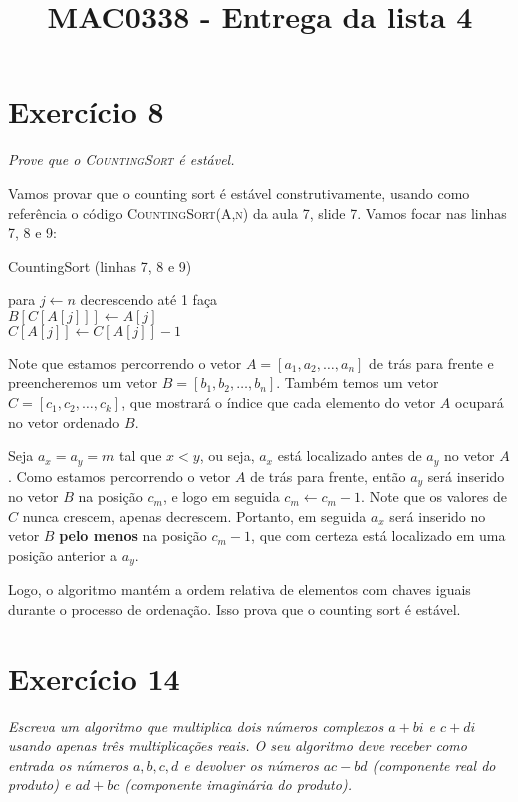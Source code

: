 \documentclass{article}
\title{MAC0338 - Entrega da lista 4}
\author{}
\date{}
\begin{document}
\maketitle

\section*{Exercício 8}
\textit{Prove que o \textsc{CountingSort} é estável.}

\bigskip

Vamos provar que o counting sort é estável construtivamente, usando como referência o código \textsc{CountingSort(A,n)} da aula 7, slide 7.
Vamos focar nas linhas 7, 8 e 9:
\begin{algorithm}
  \caption{CountingSort (linhas 7, 8 e 9)}
  para $j \gets n$ decrescendo até 1 faça \\
  \qquad $B[C[A[j]]] \gets A[j]$ \\
  \qquad $C[A[j]] \gets C[A[j]]-1$
\end{algorithm}

Note que estamos percorrendo o vetor $A = [a_1, a_2, \dots, a_n]$ de trás para frente e preencheremos um vetor $B = [b_1, b_2, \dots, b_n]$.
Também temos um vetor $C = [c_1, c_2, \dots, c_k]$, que mostrará o índice que cada elemento do vetor $A$ ocupará no vetor ordenado $B$.

Seja $a_x = a_y = m$ tal que $x < y$, ou seja, $a_x$ está localizado antes de $a_y$ no vetor $A$. Como estamos percorrendo o vetor $A$ de trás para frente, então $a_y$ será inserido no vetor $B$ na posição $c_m$, e logo em seguida $c_m \gets c_m - 1$. Note que os valores de $C$ nunca crescem, apenas decrescem. Portanto, em seguida $a_x$ será inserido no vetor $B$ \textbf{pelo menos} na posição $c_m - 1$, que com certeza está localizado em uma posição anterior a $a_y$.

Logo, o algoritmo mantém a ordem relativa de elementos com chaves iguais durante o processo de ordenação. Isso prova que o counting sort é estável.

\newpage

\section*{Exercício 14}
\textit{Escreva um algoritmo que multiplica dois números complexos $a + bi$ e $c + di$ usando apenas três multiplicações reais. O seu algoritmo deve receber como entrada os números $a, b, c, d$ e devolver os números $ac - bd$ (componente real do produto) e $ad + bc$ (componente imaginária do produto).}
\end{document}
